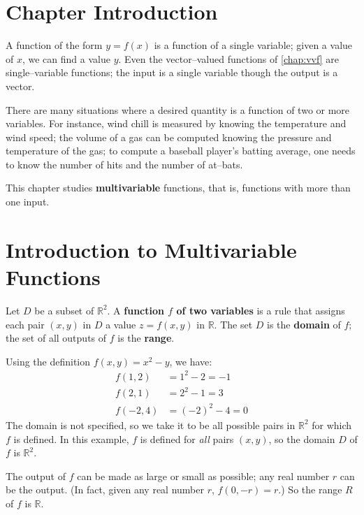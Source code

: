 \iflatexml\section*{Chapter Introduction}\fi

A function of the form $y=f(x)$ is a function of a single variable; given a value of $x$, we can find a value $y$. Even the vector--valued functions of \autoref{chap:vvf} are single--variable functions; the input is a single variable though the output is a vector.

There are many situations where a desired quantity is a function of two or more variables. For instance, wind chill is measured by knowing the temperature and wind speed; the volume of a gas can be computed knowing the pressure and temperature of the gas; to compute a baseball player's batting average, one needs to know the number of hits and the number of at--bats. 

This chapter studies \textbf{multivariable} functions, that is, functions with more than one input.

\section{Introduction to Multivariable Functions}\label{sec:multi_intro}

{Let $D$ be a subset of $\mathbb{R}^2$. A \textbf{function $f$ of two variables} is a rule that assigns each pair $(x,y)$ in $D$ a value $z=f(x,y)$ in $\mathbb{R}$. The set $D$ is the \textbf{domain} of $f$; the set of all outputs of $f$ is the \textbf{range}.
}

{Using the definition $f(x,y) = x^2-y$, we have:
\begin{align*}
f(1,2) &= 1^2-2 = -1\\
f(2,1) &=	2^2-1 = 3\\
f(-2,4) &= (-2)^2-4 = 0
\end{align*}
The domain is not specified, so we take it to be all possible pairs in $\mathbb{R}^2$ for which $f$ is defined. In this example, $f$ is defined for \emph{all} pairs $(x,y)$, so the domain $D$ of $f$ is $\mathbb{R}^2$. 

The output of $f$ can be made as large or small as possible; any real number $r$ can be the output. (In fact, given any real number $r$, $f(0,-r)=r$.) So the range $R$ of $f$ is $\mathbb{R}$.}

